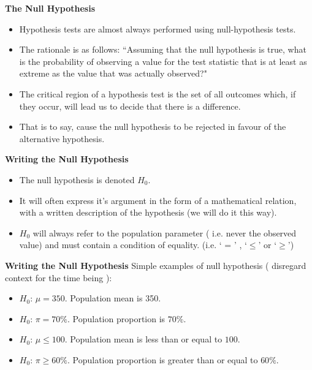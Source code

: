 
\noindent \textbf{The Null Hypothesis }
\large
\begin{itemize}
\item Hypothesis tests are almost always performed using null-hypothesis tests.

    \item The rationale is as follows: ``Assuming that the null hypothesis is true, what is the probability of observing a value for the test statistic that is at least as extreme as the value that was actually observed?"
\item
The critical region of a hypothesis test is the set of all outcomes which, if they occur, will lead us to decide that there is a difference.
\item That is to say, cause the null hypothesis to be rejected in favour of the alternative hypothesis.
\end{itemize}


{
\noindent \textbf{Writing the Null Hypothesis}
\begin{itemize}
\item The null hypothesis is denoted $H_0$.
\item It will often express it's argument in the form of a mathematical relation, with a written description of the hypothesis (we will do it this way).
\item $H_0$ will always refer to the population parameter ( i.e. never the observed value) and must contain a condition of equality. (i.e. ` = ' , `$ \leq$' or `$\geq$')
\end{itemize}
}
{
\noindent \textbf{Writing the Null Hypothesis}
Simple examples of null hypothesis ( disregard context for the time being ):
\begin{itemize}
\item $H_0$:  $\mu = 350$. Population mean is 350.
\item $H_0$:  $\pi = 70\%$. Population proportion is $70\%$.
\item $H_0$:  $\mu \leq 100$. Population mean is less than or equal to $100$.
\item $H_0$:  $\pi \geq 60\%$. Population proportion is greater than or equal to $60\%$.

\end{itemize}
}

